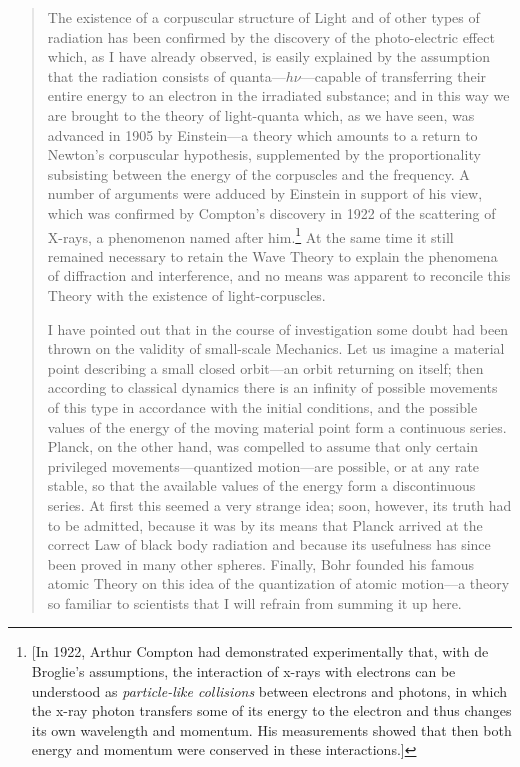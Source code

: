 \begin{quotation}
The existence of a corpuscular structure of Light and of other types of
radiation has been confirmed by the discovery of the photo-electric
effect which, as I have already observed, is easily explained by the
assumption that the radiation consists of quanta---$h\nu$---capable
of transferring their entire energy to an electron in the irradiated
substance; and in this way we are brought to the theory of light-quanta
which, as we have seen, was advanced in 1905 by Einstein---a theory
which amounts to a return to Newton's corpuscular hypothesis,
supplemented by the proportionality subsisting between the energy of the
corpuscles and the frequency. A number of arguments were adduced by
Einstein in support of his view, which was confirmed by Compton's
discovery in 1922 of the scattering of X-rays, a phenomenon named after
him.\footnote{{[}In 1922, Arthur Compton had demonstrated experimentally
  that, with de Broglie's assumptions, the interaction of x-rays with
  electrons can be understood as \emph{particle-like collisions} between
  electrons and photons, in which the x-ray photon transfers some of its
  energy to the electron and thus changes its own wavelength and
  momentum. His measurements showed that then both energy and momentum
  were conserved in these interactions.{]}} At the same time it still
remained necessary to retain the Wave Theory to explain the phenomena of
diffraction and interference, and no means was apparent to reconcile
this Theory with the existence of light-corpuscles.

I have pointed out that in the course of investigation some doubt had
been thrown on the validity of small-scale Mechanics. Let us imagine a
material point describing a small closed orbit---an orbit returning on
itself; then according to classical dynamics there is an infinity of
possible movements of this type in accordance with the initial
conditions, and the possible values of the energy of the moving material
point form a continuous series. Planck, on the other hand, was compelled
to assume that only certain privileged movements---quantized
motion---are possible, or at any rate stable, so that the available
values of the energy form a discontinuous series. At first this seemed a
very strange idea; soon, however, its truth had to be admitted, because
it was by its means that Planck arrived at the correct Law of black body
radiation and because its usefulness has since been proved in many other
spheres. Finally, Bohr founded his famous atomic Theory on this idea of
the quantization of atomic motion---a theory so familiar to scientists
that I will refrain from summing it up here.


\end{quotation}
